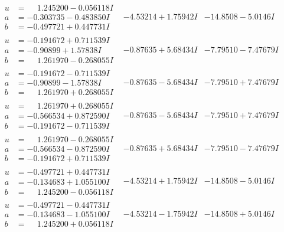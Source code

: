 \documentclass[1p]{elsarticle_modified}
\theoremstyle{definition}
\begin{document}
$$\begin{array}{c|c|c}
\begin{aligned}
u &= \phantom{-}1.245200 - 0.056118 I \\
a &= -0.303735 - 0.483850 I \\
b &= -0.497721 + 0.447731 I\end{aligned}
 & -4.53214 + 1.75942 I & -14.8508 - 5.0146 I \\ \hline\begin{aligned}
u &= -0.191672 + 0.711539 I \\
a &= -0.90899 + 1.57838 I \\
b &= \phantom{-}1.261970 - 0.268055 I\end{aligned}
 & -0.87635 + 5.68434 I & -7.79510 - 7.47679 I \\ \hline\begin{aligned}
u &= -0.191672 - 0.711539 I \\
a &= -0.90899 - 1.57838 I \\
b &= \phantom{-}1.261970 + 0.268055 I\end{aligned}
 & -0.87635 - 5.68434 I & -7.79510 + 7.47679 I \\ \hline\begin{aligned}
u &= \phantom{-}1.261970 + 0.268055 I \\
a &= -0.566534 + 0.872590 I \\
b &= -0.191672 - 0.711539 I\end{aligned}
 & -0.87635 - 5.68434 I & -7.79510 + 7.47679 I \\ \hline\begin{aligned}
u &= \phantom{-}1.261970 - 0.268055 I \\
a &= -0.566534 - 0.872590 I \\
b &= -0.191672 + 0.711539 I\end{aligned}
 & -0.87635 + 5.68434 I & -7.79510 - 7.47679 I \\ \hline\begin{aligned}
u &= -0.497721 + 0.447731 I \\
a &= -0.134683 + 1.055100 I \\
b &= \phantom{-}1.245200 - 0.056118 I\end{aligned}
 & -4.53214 + 1.75942 I & -14.8508 - 5.0146 I \\ \hline\begin{aligned}
u &= -0.497721 - 0.447731 I \\
a &= -0.134683 - 1.055100 I \\
b &= \phantom{-}1.245200 + 0.056118 I\end{aligned}
 & -4.53214 - 1.75942 I & -14.8508 + 5.0146 I \\ \hline\begin{aligned}

\end{aligned}
\end{array}$$
\end{document}
